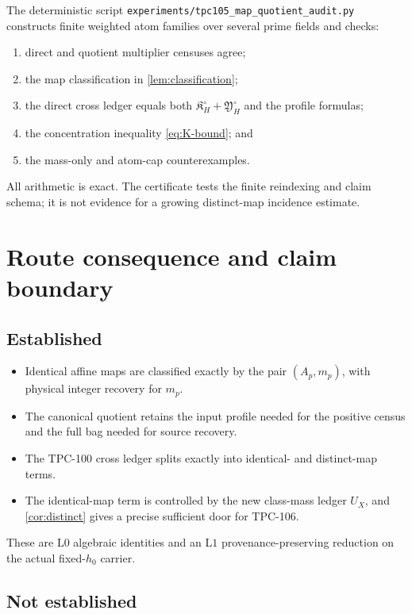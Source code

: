 \documentclass[11pt]{article}
\theoremstyle{definition}
\theoremstyle{remark}
\newcommand{\Lzero}{\mathrm{L0}}
\newcommand{\Lone}{\mathrm{L1}}
\begin{document}
The deterministic script
\texttt{experiments/tpc105\_map\_quotient\_audit.py} constructs
finite weighted atom families over several prime fields and checks:
\begin{enumerate}[leftmargin=2em]
\item direct and quotient multiplier censuses agree;
\item the map classification in \cref{lem:classification};
\item the direct cross ledger equals both
\(\mathfrak K_H^\circ+\mathfrak Y_H^\circ\) and the profile
formulas;
\item the concentration inequality \eqref{eq:K-bound}; and
\item the mass-only and atom-cap counterexamples.
\end{enumerate}
All arithmetic is exact.  The certificate tests the finite
reindexing and claim schema; it is not evidence for a growing
distinct-map incidence estimate.

\section{Route consequence and claim boundary}
\label{sec:boundary}

\subsection*{Established}

\begin{itemize}[leftmargin=2em]
\item Identical affine maps are classified exactly by the pair
\((A_p,m_p)\), with physical integer recovery for \(m_p\).
\item The canonical quotient retains the input profile needed for
the positive census and the full bag needed for source recovery.
\item The TPC-100 cross ledger splits exactly into identical- and
distinct-map terms.
\item The identical-map term is controlled by the new class-mass
ledger \(U_X\), and \cref{cor:distinct} gives a precise sufficient
door for TPC-106.
\end{itemize}

These are \(\Lzero\) algebraic identities and an \(\Lone\)
provenance-preserving reduction on the actual fixed-\(h_0\) carrier.

\subsection*{Not established}
\end{document}
